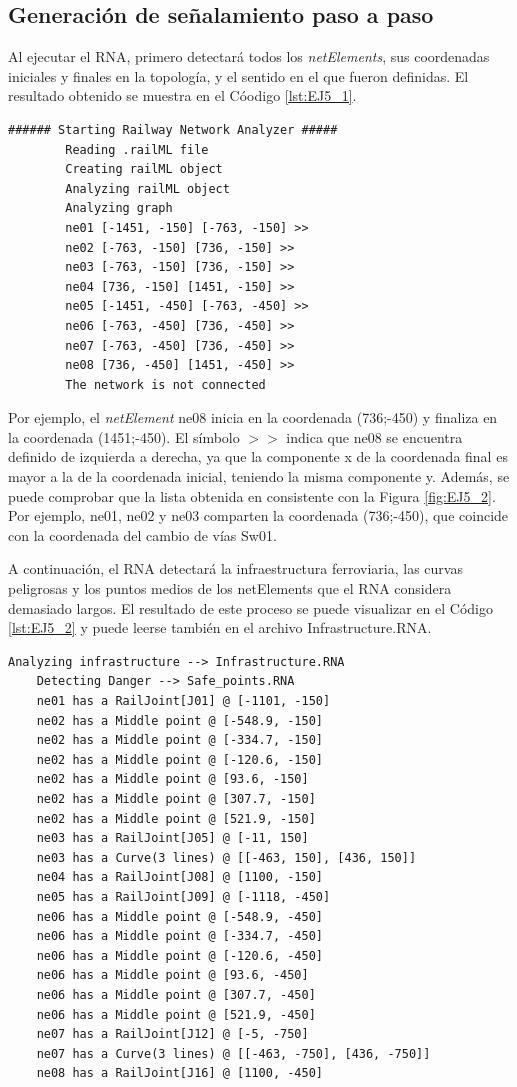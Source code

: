 \subsection{Generación de señalamiento paso a paso}

	Al ejecutar el RNA, primero detectará todos los \textit{netElements}, sus coordenadas iniciales y finales en la topología, y el sentido en el que fueron definidas. El resultado obtenido se muestra en el Cóodigo \ref{lst:EJ5_1}.
	
	\begin{lstlisting}[language = {}, caption = Detección de \textit{netElements} por parte del RNA , label = {lst:EJ5_1}]
		###### Starting Railway Network Analyzer #####
		Reading .railML file
		Creating railML object
		Analyzing railML object
		Analyzing graph
		ne01 [-1451, -150] [-763, -150] >>
		ne02 [-763, -150] [736, -150] >>
		ne03 [-763, -150] [736, -150] >>
		ne04 [736, -150] [1451, -150] >>
		ne05 [-1451, -450] [-763, -450] >>
		ne06 [-763, -450] [736, -450] >>
		ne07 [-763, -450] [736, -450] >>
		ne08 [736, -450] [1451, -450] >>
		The network is not connected
	\end{lstlisting}
	
	Por ejemplo, el \textit{netElement} ne08 inicia en la coordenada (736;-450) y finaliza en la coordenada (1451;-450). El símbolo $>>$ indica que ne08 se encuentra definido de izquierda a derecha, ya que la componente x de la coordenada final es mayor a la de la coordenada inicial, teniendo la misma componente y. Además, se puede comprobar que la lista obtenida en consistente con la Figura \ref{fig:EJ5_2}. Por ejemplo, ne01, ne02 y ne03 comparten la coordenada (736;-450), que coincide con la coordenada del cambio de vías Sw01.
	
	A continuación, el RNA detectará la infraestructura ferroviaria, las curvas peligrosas y los puntos medios de los netElements que el RNA considera demasiado largos. El resultado de este proceso se puede visualizar en el Código \ref{lst:EJ5_2} y puede leerse también en el archivo Infrastructure.RNA.
	
	\begin{lstlisting}[language = {}, caption = Detección de puntos críticos por parte del RNA , label = {lst:EJ5_2}]
	Analyzing infrastructure --> Infrastructure.RNA
	Detecting Danger --> Safe_points.RNA
	ne01 has a RailJoint[J01] @ [-1101, -150]     
	ne02 has a Middle point @ [-548.9, -150]      
	ne02 has a Middle point @ [-334.7, -150]      
	ne02 has a Middle point @ [-120.6, -150]
	ne02 has a Middle point @ [93.6, -150]
	ne02 has a Middle point @ [307.7, -150]
	ne02 has a Middle point @ [521.9, -150]
	ne03 has a RailJoint[J05] @ [-11, 150]
	ne03 has a Curve(3 lines) @ [[-463, 150], [436, 150]]
	ne04 has a RailJoint[J08] @ [1100, -150]
	ne05 has a RailJoint[J09] @ [-1118, -450]
	ne06 has a Middle point @ [-548.9, -450]
	ne06 has a Middle point @ [-334.7, -450]
	ne06 has a Middle point @ [-120.6, -450]
	ne06 has a Middle point @ [93.6, -450]
	ne06 has a Middle point @ [307.7, -450]
	ne06 has a Middle point @ [521.9, -450]
	ne07 has a RailJoint[J12] @ [-5, -750]
	ne07 has a Curve(3 lines) @ [[-463, -750], [436, -750]]
	ne08 has a RailJoint[J16] @ [1100, -450]
	\end{lstlisting}
	
